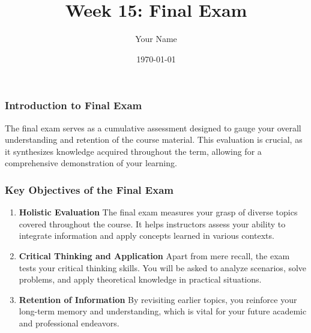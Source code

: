 \documentclass{beamer}
\title{Week 15: Final Exam}
\author{Your Name}
\institute{Your Institution}
\date{\today}
\begin{document}
\frame{\titlepage}

\begin{frame}[fragile]
    \frametitle{Introduction to Final Exam}
    The final exam serves as a cumulative assessment designed to gauge your overall understanding and retention of the course material. This evaluation is crucial, as it synthesizes knowledge acquired throughout the term, allowing for a comprehensive demonstration of your learning.
\end{frame}

\begin{frame}[fragile]
    \frametitle{Key Objectives of the Final Exam}
    \begin{enumerate}
        \item \textbf{Holistic Evaluation}  
        The final exam measures your grasp of diverse topics covered throughout the course. It helps instructors assess your ability to integrate information and apply concepts learned in various contexts.
        
        \item \textbf{Critical Thinking and Application}  
        Apart from mere recall, the exam tests your critical thinking skills. You will be asked to analyze scenarios, solve problems, and apply theoretical knowledge in practical situations.
        
        \item \textbf{Retention of Information}  
        By revisiting earlier topics, you reinforce your long-term memory and understanding, which is vital for your future academic and professional endeavors.
    \end{enumerate}
\end{frame}
\end{document}
